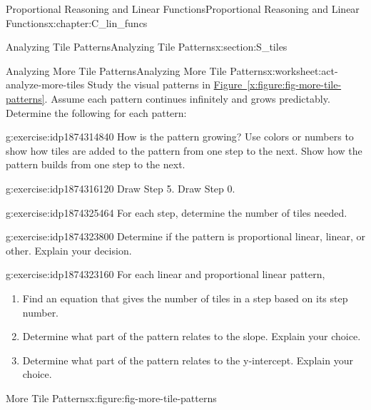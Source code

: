 \documentclass[oneside,10pt,]{book}
\newcommand{\xreffont}{\relax}
\numberwithin{equation}{chapter}
\begin{document}
\begin{chapterptx}{Proportional Reasoning and Linear Functions}{}{Proportional Reasoning and Linear Functions}{}{}{x:chapter:C_lin_funcs}
\begin{sectionptx}{Analyzing Tile Patterns}{}{Analyzing Tile Patterns}{}{}{x:section:S_tiles}
\begin{worksheet-subsection}{Analyzing More Tile Patterns}{}{Analyzing More Tile Patterns}{}{}{x:worksheet:act-analyze-more-tiles}
Study the visual patterns in \hyperref[x:figure:fig-more-tile-patterns]{Figure~{\xreffont\ref{x:figure:fig-more-tile-patterns}}}. Assume each pattern continues infinitely and grows predictably. Determine the following for each pattern:%
\begin{divisionexercise}{1}{}{}{g:exercise:idp1874314840}%
How is the pattern growing? Use colors or numbers to show how tiles are added to the pattern from one step to the next. Show how the pattern builds from one step to the next.%
\end{divisionexercise}%
\begin{divisionexercise}{2}{}{}{g:exercise:idp1874316120}%
Draw Step 5. Draw Step 0.%
\end{divisionexercise}%
\begin{divisionexercise}{3}{}{}{g:exercise:idp1874325464}%
For each step, determine the number of tiles needed.%
\end{divisionexercise}%
\begin{divisionexercise}{4}{}{}{g:exercise:idp1874323800}%
Determine if the pattern is proportional linear, linear, or other. Explain your decision.%
\end{divisionexercise}%
\begin{divisionexercise}{5}{}{}{g:exercise:idp1874323160}%
For each linear and proportional linear pattern,%
\begin{enumerate}[font=\bfseries,label=(\alph*),ref=\alph*]
\item{}Find an equation that gives the number of tiles in a step based on its step number.%
\item{}Determine what part of the pattern relates to the slope. Explain your choice.%
\item{}Determine what part of the pattern relates to the y-intercept. Explain your choice.%
\end{enumerate}
\end{divisionexercise}%
\clearpage
\begin{figureptx}{More Tile Patterns}{x:figure:fig-more-tile-patterns}{}%
\begin{image}{0.1}{0.8}{0.1}%

\end{image}
\end{figureptx}
\end{worksheet-subsection}
\end{sectionptx}
\end{chapterptx}
\end{document}
